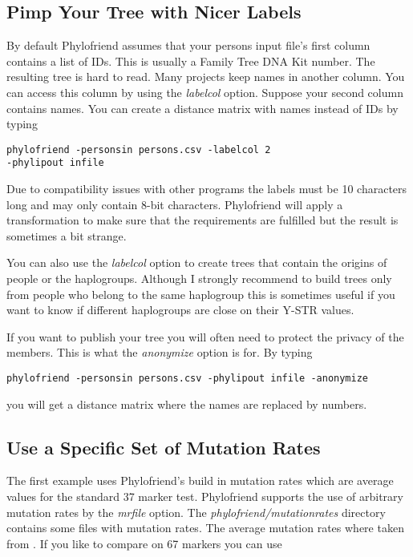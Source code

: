 \subsection{Pimp Your Tree with Nicer Labels}

By default Phylofriend assumes that your persons input file's
first column contains a list of IDs. This is usually a Family
Tree DNA Kit number. The resulting tree is hard to read. Many
projects keep names in another column. You can access this 
column by using the \emph{labelcol} option. Suppose your second
column contains names. You can create a distance matrix with
names instead of IDs by typing

\noindent\texttt{phylofriend -personsin persons.csv -labelcol 2\\
-phylipout infile}

Due to compatibility issues with other programs the labels
must be 10 characters long and may only contain 8-bit
characters. Phylofriend will apply a transformation to
make sure that the requirements are fulfilled 
but the result is sometimes a bit strange.

You can also use the \emph{labelcol} option to create trees
that contain the origins of people or the haplogroups. Although
I strongly recommend to build trees only from people who
belong to the same haplogroup this is sometimes useful if
you want to know if different haplogroups are close on their
Y-STR values.

If you want to publish your tree you will often need to
protect the privacy of the members. This is what the
\emph{anonymize} option is for. By typing

\noindent\texttt{phylofriend -personsin persons.csv -phylipout infile -anonymize}

you will get a distance matrix where the names are replaced
by numbers.


\subsection{Use a Specific Set of Mutation Rates}

The first example uses Phylofriend's build in mutation rates
which are average values for the standard 37 marker test.
Phylofriend supports the use of arbitrary mutation rates by
the \emph{mrfile} option. The \emph{phylofriend/mutationrates}
directory contains some files with mutation rates. The average
mutation rates where taken from \cite{Kly12}.
If you like to compare on 67 markers you can use

